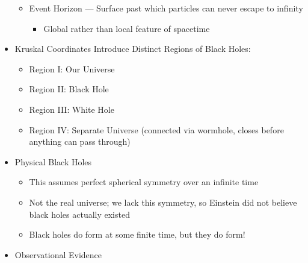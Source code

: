 \begin{itemize}
\begin{itemize}
\begin{itemize}
        \end{itemize}

      \item Event Horizon — Surface past which particles can never escape to infinity

        \begin{itemize}

          \item Global rather than local feature of spacetime

        \end{itemize}

    \end{itemize}

  \item Kruskal Coordinates Introduce Distinct Regions of Black Holes:

    \begin{itemize}

      \item Region I: Our Universe

      \item Region II: Black Hole

      \item Region III: White Hole

      \item Region IV: Separate Universe (connected via wormhole, closes before anything can pass through)

    \end{itemize}

  \item Physical Black Holes

    \begin{itemize}

      \item This assumes perfect spherical symmetry over an infinite time

      \item Not the real universe; we lack this symmetry, so Einstein did not believe black holes actually existed

      \item Black holes do form at some finite time, but they do form!

    \end{itemize}

  \item Observational Evidence

    \begin{itemize}


\end{itemize}
\end{itemize}
